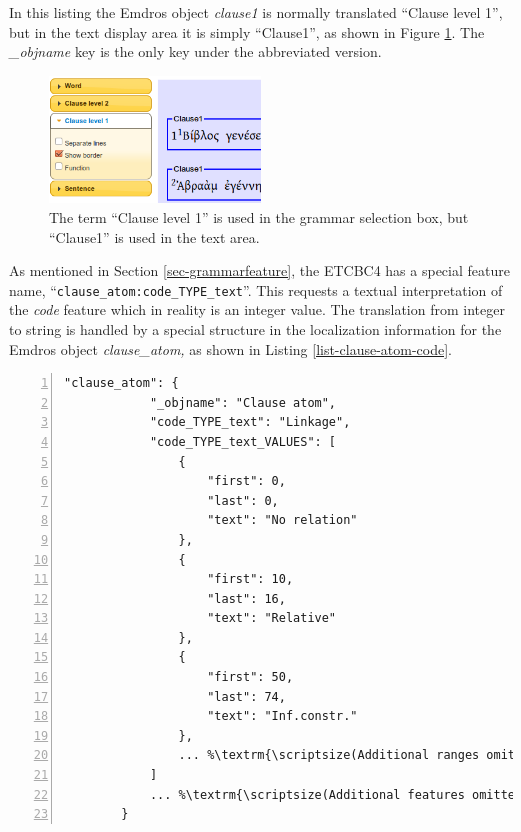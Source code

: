\documentclass[11pt,oneside,a4paper]{memoir}
\begin{document}
In this listing the Emdros object \emph{clause1} is normally translated ``Clause level 1'', but in
the text display area it is simply ``Clause1'', as shown in Figure \ref{fig-clause1}. The
\emph{\_objname} key is the only key under the abbreviated version.

\begin{figure}[h]
  \begin{center}
    \parbox{0.5\textwidth}{
      \includegraphics[width=0.5\textwidth]{clause1.png}
      \caption{The term ``Clause level 1'' is used in the grammar selection box, but ``Clause1'' is
        used in the text area.}\label{fig-clause1}
    }
  \end{center}
\end{figure}

As mentioned in Section \ref{sec-grammarfeature}, the ETCBC4 has a special feature name,
``\texttt{clause\_atom:code\_TYPE\_text}''. This requests a textual interpretation of the
\emph{code} feature which in reality is an integer value. The translation from integer to string is
handled by a special structure in the localization information for the Emdros object
\emph{clause\_atom,} as shown in Listing \ref{list-clause-atom-code}.


\begin{lstlisting}[numbers=left,caption=Handling integer to text translation,label=list-clause-atom-code]
        "clause_atom": {
            "_objname": "Clause atom",
            "code_TYPE_text": "Linkage",
            "code_TYPE_text_VALUES": [
                {
                    "first": 0,
                    "last": 0,
                    "text": "No relation"
                },
                {
                    "first": 10,
                    "last": 16,
                    "text": "Relative"
                },
                {
                    "first": 50,
                    "last": 74,
                    "text": "Inf.constr."
                },
                ... %\textrm{\scriptsize(Additional ranges omitted)}%
            ]
            ... %\textrm{\scriptsize(Additional features omitted)}%
        }
\end{lstlisting}
\end{document}
